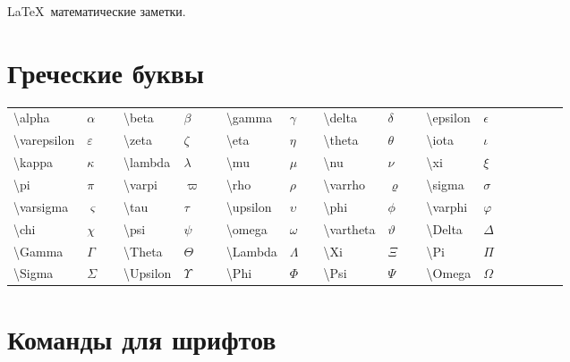 \documentclass[a4paper]{article}
\begin{document}
\begin{center}
    {\LARGE \LaTeX\ математические заметки.}
\end{center}

\tableofcontents

\newpage

\section{Греческие буквы}

\begin{center}
\begin{tabular}{*{19}{l}}
\textbackslash alpha & $\alpha$ && \textbackslash beta & $\beta$ && \textbackslash gamma & $\gamma$ && \textbackslash delta & $\delta$ && \textbackslash epsilon & $\epsilon$ \\
\textbackslash varepsilon & $\varepsilon$ && \textbackslash zeta & $\zeta$ && \textbackslash eta & $\eta$ && \textbackslash theta & $\theta$ && \textbackslash iota & $\iota$ \\
\textbackslash kappa & $\kappa$ && \textbackslash lambda & $\lambda$ && \textbackslash mu & $\mu$ && \textbackslash nu & $\nu$ && \textbackslash xi & $\xi$ \\
\textbackslash pi & $\pi$ && \textbackslash varpi & $\varpi$ && \textbackslash rho & $\rho$ && \textbackslash varrho & $\varrho$ && \textbackslash sigma & $\sigma$ \\
\textbackslash varsigma & $\varsigma$ && \textbackslash tau & $\tau$ && \textbackslash upsilon & $\upsilon$ && \textbackslash phi & $\phi$ && \textbackslash varphi & $\varphi$ \\
\textbackslash chi & $\chi$ && \textbackslash psi & $\psi$ && \textbackslash omega & $\omega$ && \textbackslash vartheta & $\vartheta$ && \textbackslash Delta & $\Delta$ \\
\textbackslash Gamma & $\Gamma$ && \textbackslash Theta & $\Theta$ && \textbackslash Lambda & $\Lambda$ && \textbackslash Xi & $\Xi$ && \textbackslash Pi & $\Pi$ \\
\textbackslash Sigma & $\Sigma$ && \textbackslash Upsilon & $\Upsilon$ && \textbackslash Phi & $\Phi$ && \textbackslash Psi & $\Psi$ && \textbackslash Omega & $\Omega$ \\
\end{tabular}
\end{center}

\section{Команды для шрифтов }
\end{document}

